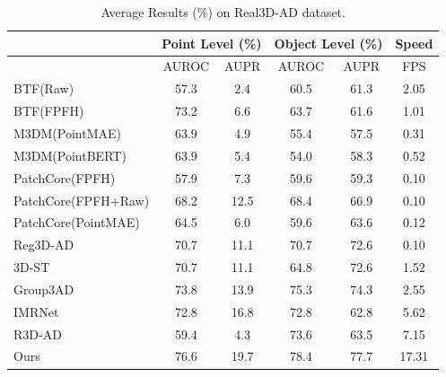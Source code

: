 \begin{table}[ht]
\centering
\caption{Average Results (\%) on Real3D-AD dataset.}
\label{tab:Real3D}
\begin{tabular}{l|cc|cc|c}
\hline
& \multicolumn{2}{c|}{Point Level (\%)} & \multicolumn{2}{c|}{Object Level (\%)} & Speed \\
\hline
& AUROC & AUPR & AUROC & AUPR & FPS \\ 
\hline
BTF(Raw)                            & 57.3 & 2.4 & 60.5 & 61.3  & 2.05 \\
BTF(FPFH)                           & 73.2 & 6.6 & 63.7 & 61.6  & 1.01 \\
M3DM(PointMAE)                      & 63.9 & 4.9 & 55.4 & 57.5  & 0.31 \\
M3DM(PointBERT)                     & 63.9 & 5.4 & 54.0 & 58.3  & 0.52 \\
PatchCore(FPFH)                     & 57.9 & 7.3 & 59.6 & 59.3  & 0.10 \\
PatchCore(FPFH+Raw)                 & 68.2 & 12.5 & 68.4 & 66.9  & 0.10 \\
PatchCore(PointMAE)                 & 64.5 & 6.0 & 59.6 & 63.6  & 0.12 \\
Reg3D-AD \cite{liu2023real3d}       & 70.7 & 11.1 & 70.7 & 72.6  & 0.10 \\
3D-ST \cite{bergmann2023anomaly}    & 70.7 & 11.1 & 64.8 & 72.6  & 1.52 \\
Group3AD   \cite{zhu2024towards}    & 73.8 & 13.9 & 75.3 & 74.3  & 2.55 \\
IMRNet   \cite{li2024towards}       & 72.8 & 16.8 & 72.8 & 62.8  & 5.62 \\
R3D-AD   \cite{zhou2024r3d}         & 59.4 & 4.3 & 73.6 & 63.5  & 7.15 \\
Ours                                & 76.6 & 19.7 & 78.4 & 77.7 & 17.31 \\
\hline
\end{tabular}
\end{table}


